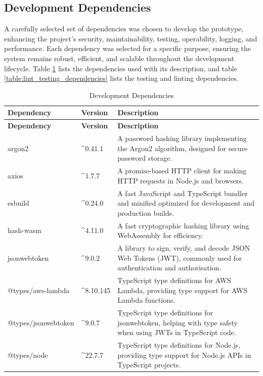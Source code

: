 \subsection{Development Dependencies}
A carefully selected set of dependencies was chosen to develop the prototype, enhancing the project's security, maintainability, testing, operability, logging, and performance. Each dependency was selected for a specific purpose, ensuring the system remains robust, efficient, and scalable throughout the development lifecycle. Table \ref{table:dev_dependencies} lists the dependencies used with its description, and table \ref{table:lint_testing_dependencies} lists the testing and linting dependencies. 

\begin{longtable}{|l|l|p{8cm}|}
\caption{Development Dependencies}
\label{table:dev_dependencies}
\hline
\rowcolor{grey!15}
\textbf{Dependency} & \textbf{Version} & \textbf{Description} \\ \hline
\endfirsthead
\hline
\rowcolor{grey!15}
\textbf{Dependency} & \textbf{Version} & \textbf{Description} \\ \hline
\endhead
\endfoot
\hline
\endlastfoot
argon2 & \textasciicircum 0.41.1 & A password hashing library implementing the Argon2 algorithm, designed for secure password storage. \\ \hline
axios & \textasciicircum 1.7.7 & A promise-based HTTP client for making HTTP requests in Node.js and browsers. \\ \hline
esbuild & \textasciicircum 0.24.0 & A fast JavaScript and TypeScript bundler and minified optimized for development and production builds.\\ \hline
hash-wasm & \textasciicircum 4.11.0 & A fast cryptographic hashing library using WebAssembly for efficiency. \\ \hline
jsonwebtoken & \textasciicircum 9.0.2 & A library to sign, verify, and decode JSON Web Tokens (JWT), commonly used for authentication and authorisation. \\ \hline
@types/aws-lambda & \textasciicircum 8.10.145 & TypeScript type definitions for AWS Lambda, providing type support for AWS Lambda functions. \\ \hline
@types/jsonwebtoken & \textasciicircum 9.0.7 & TypeScript type definitions for jsonwebtoken, helping with type safety when using JWTs in TypeScript code. \\ \hline
@types/node & \textasciicircum 22.7.7 & TypeScript type definitions for Node.js, providing type support for Node.js APIs in TypeScript projects.\\ \hline

\end{longtable}

